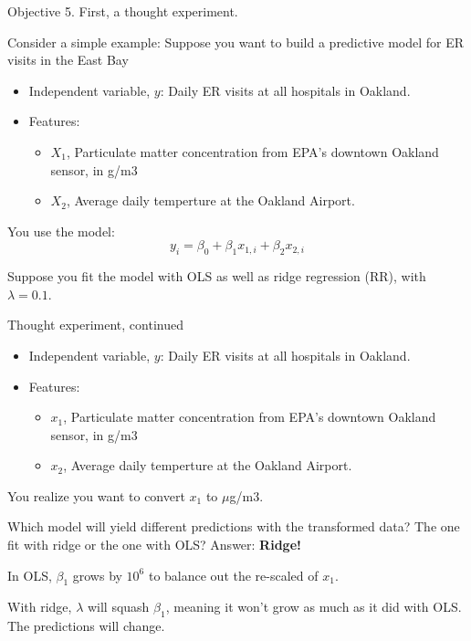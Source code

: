 \documentclass[mathserif, aspectratio=169]{beamer}
\begin{document}
\begin{frame}{Objective 5.  First, a thought experiment.}

	Consider a simple example:  Suppose you want to build a predictive model for ER visits in the East Bay
	\begin{itemize}
		\item Independent variable, $y$: Daily ER visits at all hospitals in Oakland.
		\item Features: 
			\begin{itemize}
				\item $X_1$, Particulate matter concentration from EPA's downtown Oakland sensor, in g/m3 
				\item $X_2$, Average daily temperture at the Oakland Airport.  
			\end{itemize}
	\end{itemize}

	You use the model:
	\begin{equation*}
		y_i = \beta_0 + \beta_1 x_{1,i} + \beta_2 x_{2,i}
	\end{equation*}

	Suppose you fit the model with OLS as well as ridge regression (RR), with $\lambda = 0.1$.    
\end{frame}

\begin{frame}{Thought experiment, continued}

	\begin{itemize}
		\item Independent variable, $y$: Daily ER visits at all hospitals in Oakland.
		\item Features: 
			\begin{itemize}
				\item $x_1$, Particulate matter concentration from EPA's downtown Oakland sensor, in g/m3 
				\item $x_2$, Average daily temperture at the Oakland Airport.  
			\end{itemize}
	\end{itemize}

	You realize you want to convert $x_1$ to $\mu$g/m3.  

	\vspace{5mm}

	Which model will yield different predictions with the transformed data?  The one fit with ridge or the one with OLS? \pause Answer: \textbf{Ridge!}   
	\vspace{5mm}

	In OLS, $\beta_1$ grows by $10^6$ to balance out the re-scaled of $x_1$.  
	\vspace{5mm}

	With ridge, $\lambda$ will squash $\beta_1$, meaning it won't grow as much as it did with OLS.  The predictions will change.
\end{frame}
\end{document}

